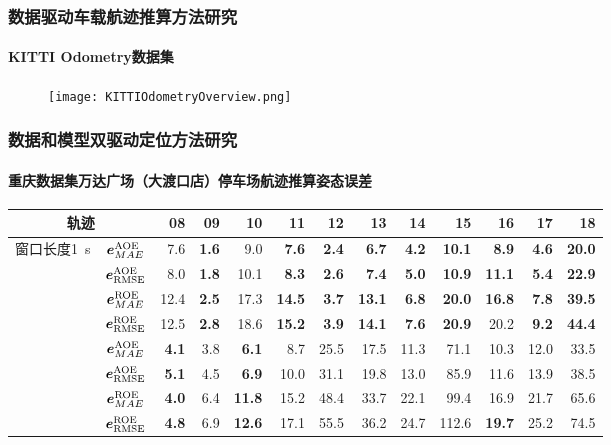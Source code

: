 \begin{frame} 
 	\frametitle{数据驱动车载航迹推算方法研究}
 	\framesubtitle{KITTI Odometry数据集}
   	\begin{figure}
   	\centering
	    \texttt{[image: KITTIOdometryOverview.png]}
   	\end{figure}  
\end{frame}

\begin{frame} 
 	\frametitle{数据和模型双驱动定位方法研究}
 	\framesubtitle{重庆数据集万达广场（大渡口店）停车场航迹推算姿态误差}
    {\small
    \setlength{\tabcolsep}{2pt}
		\begin{tabular*}{\linewidth}{@{\extracolsep{\fill}}ccrrrrrrrrrrr}
			\toprule
			\multicolumn{2}{c}{轨迹} & 08 & 09 & 10 & 11 & 12 & 13 & 14 & 15 & 16 & 17 & 18 \\
			\midrule
			\multirow{4}{*}{窗口长度\SI{1}{\second}} 
			& $\vb*{e}^{\mathrm{AOE}}_{MAE}$ & 7.6 & \textbf{1.6} & 9.0 & \textbf{7.6} & \textbf{2.4} & \textbf{6.7} & \textbf{4.2} & \textbf{10.1} & \textbf{8.9} & \textbf{4.6} & \textbf{20.0} \\
			& $\vb*{e}^{\mathrm{AOE}}_{\mathrm{RMSE}}$ & 8.0 & \textbf{1.8} & 10.1 & \textbf{8.3} & \textbf{2.6} & \textbf{7.4} & \textbf{5.0} & \textbf{10.9} & \textbf{11.1} & \textbf{5.4} & \textbf{22.9} \\
			& $\vb*{e}^{\mathrm{ROE}}_{MAE}$ & 12.4 & \textbf{2.5} & 17.3 & \textbf{14.5} & \textbf{3.7} & \textbf{13.1} & \textbf{6.8} & \textbf{20.0} & \textbf{16.8} & \textbf{7.8} & \textbf{39.5} \\
			& $\vb*{e}^{\mathrm{ROE}}_{\mathrm{RMSE}}$ & 12.5 & \textbf{2.8} & 18.6 & \textbf{15.2} & \textbf{3.9} & \textbf{14.1} & \textbf{7.6} & \textbf{20.9} & 20.2 & \textbf{9.2} & \textbf{44.4} \\ \addlinespace[1mm]
			\multirow{4}{*}{窗口长度\SI{2}{\second}}
			& $\vb*{e}^{\mathrm{AOE}}_{MAE}$ & \textbf{4.1} & 3.8 & \textbf{6.1} & 8.7 & 25.5 & 17.5 & 11.3 & 71.1 & 10.3 & 12.0 & 33.5 \\
			& $\vb*{e}^{\mathrm{AOE}}_{\mathrm{RMSE}}$ & \textbf{5.1} & 4.5 & \textbf{6.9} & 10.0 & 31.1 & 19.8 & 13.0 & 85.9 & 11.6 & 13.9 & 38.5 \\
			& $\vb*{e}^{\mathrm{ROE}}_{MAE}$ & \textbf{4.0} & 6.4 & \textbf{11.8} & 15.2 & 48.4 & 33.7 & 22.1 & 99.4 & 16.9 & 21.7 & 65.6 \\
			& $\vb*{e}^{\mathrm{ROE}}_{\mathrm{RMSE}}$ & \textbf{4.8} & 6.9 & \textbf{12.6} & 17.1 & 55.5 & 36.2 & 24.7 & 112.6 & \textbf{19.7} & 25.2 & 74.5 \\
			\bottomrule 
		\end{tabular*}
	}	
\end{frame}

